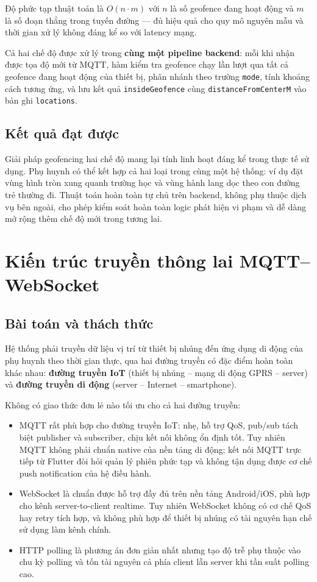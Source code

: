 \documentclass[../DoAn.tex]{subfiles}
\begin{document}
Độ phức tạp thuật toán là $O(n \cdot m)$ với $n$ là số geofence đang hoạt động và $m$ là số đoạn thẳng trong tuyến đường — đủ hiệu quả cho quy mô nguyên mẫu và thời gian xử lý không đáng kể so với latency mạng.

Cả hai chế độ được xử lý trong \textbf{cùng một pipeline backend}: mỗi khi nhận được tọa độ mới từ MQTT, hàm kiểm tra geofence chạy lần lượt qua tất cả geofence đang hoạt động của thiết bị, phân nhánh theo trường \texttt{mode}, tính khoảng cách tương ứng, và lưu kết quả \texttt{insideGeofence} cùng \texttt{distanceFromCenterM} vào bản ghi \texttt{locations}.

\subsection{Kết quả đạt được}

Giải pháp geofencing hai chế độ mang lại tính linh hoạt đáng kể trong thực tế sử dụng. Phụ huynh có thể kết hợp cả hai loại trong cùng một hệ thống: ví dụ đặt vùng hình tròn xung quanh trường học và vùng hành lang dọc theo con đường trẻ thường đi. Thuật toán hoàn toàn tự chủ trên backend, không phụ thuộc dịch vụ bên ngoài, cho phép kiểm soát hoàn toàn logic phát hiện vi phạm và dễ dàng mở rộng thêm chế độ mới trong tương lai.

\section{Kiến trúc truyền thông lai MQTT–WebSocket}
\label{section:5.3}

\subsection{Bài toán và thách thức}

Hệ thống phải truyền dữ liệu vị trí từ thiết bị nhúng đến ứng dụng di động của phụ huynh theo thời gian thực, qua hai đường truyền có đặc điểm hoàn toàn khác nhau: \textbf{đường truyền IoT} (thiết bị nhúng – mạng di động GPRS – server) và \textbf{đường truyền di động} (server – Internet – smartphone).

Không có giao thức đơn lẻ nào tối ưu cho cả hai đường truyền:
\begin{itemize}
    \item MQTT rất phù hợp cho đường truyền IoT: nhẹ, hỗ trợ QoS, pub/sub tách biệt publisher và subscriber, chịu kết nối không ổn định tốt. Tuy nhiên MQTT không phải chuẩn native của nền tảng di động; kết nối MQTT trực tiếp từ Flutter đòi hỏi quản lý phiên phức tạp và không tận dụng được cơ chế push notification của hệ điều hành.
    \item WebSocket là chuẩn được hỗ trợ đầy đủ trên nền tảng Android/iOS, phù hợp cho kênh server-to-client realtime. Tuy nhiên WebSocket không có cơ chế QoS hay retry tích hợp, và không phù hợp để thiết bị nhúng có tài nguyên hạn chế sử dụng làm kênh chính.
    \item HTTP polling là phương án đơn giản nhất nhưng tạo độ trễ phụ thuộc vào chu kỳ polling và tốn tài nguyên cả phía client lẫn server khi tần suất polling cao.
\end{itemize}
\end{document}
